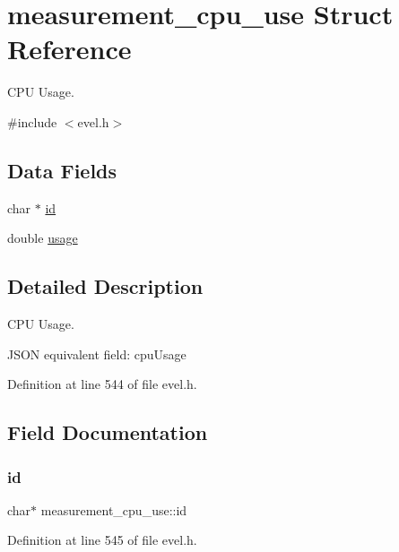 \hypertarget{structmeasurement__cpu__use}{}\section{measurement\+\_\+cpu\+\_\+use Struct Reference}
\label{structmeasurement__cpu__use}


C\+PU Usage.  




{\ttfamily \#include $<$evel.\+h$>$}

\subsection*{Data Fields}
\begin{DoxyCompactItemize}
\item 
char $\ast$ \hyperlink{structmeasurement__cpu__use_aff0b9aae5dce5b1089cfd5abff278596}{id}
\item 
double \hyperlink{structmeasurement__cpu__use_a5407603f3d446b061c23256197e2979c}{usage}
\end{DoxyCompactItemize}


\subsection{Detailed Description}
C\+PU Usage. 

J\+S\+ON equivalent field\+: cpu\+Usage 

Definition at line 544 of file evel.\+h.



\subsection{Field Documentation}
\hypertarget{structmeasurement__cpu__use_aff0b9aae5dce5b1089cfd5abff278596}{}\label{structmeasurement__cpu__use_aff0b9aae5dce5b1089cfd5abff278596} 
\subsubsection{\texorpdfstring{id}{id}}
{\footnotesize\ttfamily char$\ast$ measurement\+\_\+cpu\+\_\+use\+::id}



Definition at line 545 of file evel.\+h.

